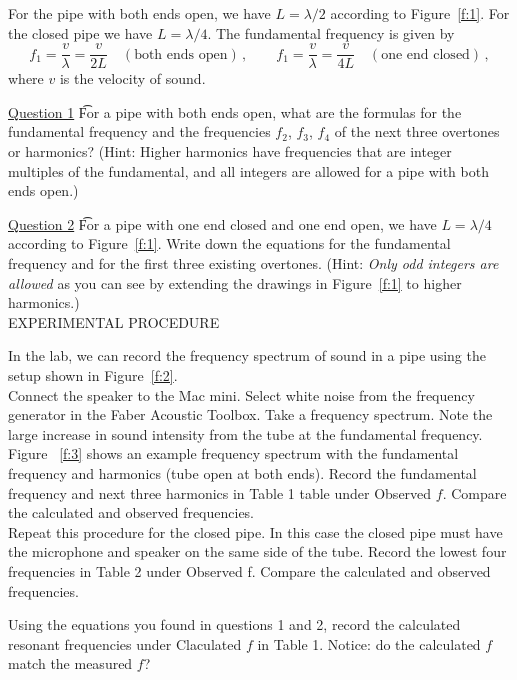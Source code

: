 \documentclass[11pt]{NSF}
\def\be{\begin{equation}}
\def\ee{\end{equation}}
\begin{document}
For the pipe with both ends open, we have $L = \lambda/2$ according to 
Figure~\ref{f:1}. 
For the closed pipe we have $L = \lambda/4$. 
The fundamental frequency is given by
%
\be
f_1 = \frac{v}{\lambda} = \frac{v}{2L}
\quad(\text{both ends open})\,,
\qquad
f_1 = \frac{v}{\lambda} = \frac{v}{4L} 
\quad(\text{one end closed})\,,
\ee
%
where $v$ is the velocity of sound.


\underline{Question 1} \t  For a pipe with both ends open, what are the formulas for the fundamental
frequency and the frequencies $f_2$, $f_3$, $f_4$ of the next three overtones or harmonics?
(Hint: Higher harmonics have frequencies that are integer multiples of the
fundamental, and all integers are allowed for a pipe with both ends open.)

\underline{Question 2} \t 
For a pipe with one end closed and one end open, we have $L = \lambda/4$ 
according to Figure~\ref{f:1}. 
Write down the equations for the fundamental frequency and for the
first three existing overtones. 
(Hint: {\em Only odd integers are allowed} as you can see by extending 
the drawings in Figure~\ref{f:1} to higher harmonics.) \\


EXPERIMENTAL PROCEDURE

In the lab, we can record the frequency spectrum of sound in a pipe
using the setup shown in Figure~\ref{f:2}. \\

Connect the speaker to the Mac mini. Select white noise from the frequency generator
in the Faber Acoustic Toolbox. Take a frequency spectrum. Note the large increase in sound intensity from the tube at the fundamental frequency. Figure ~\ref{f:3} shows an example frequency spectrum with the fundamental frequency and harmonics
(tube open at both ends). Record the fundamental frequency and next three harmonics in Table 1
table under Observed $f$. Compare the calculated and observed frequencies. \\

Repeat this procedure for the closed pipe. In this case the closed pipe must have the microphone
and speaker on the same side of the tube. Record the lowest four frequencies in Table 2 under
Observed f. Compare the calculated and observed frequencies.

Using the equations you found in questions 1 and 2, record the calculated resonant frequencies under Claculated $f$ in Table 1. Notice: do the calculated $f$ match the measured $f$?
\end{document}
